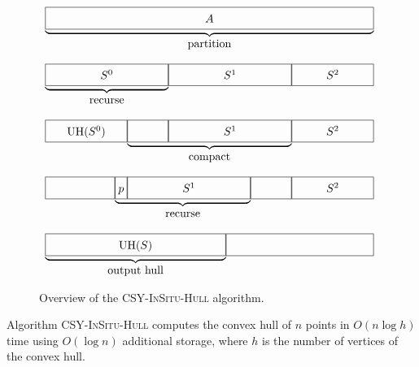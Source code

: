 \documentclass{elsart}
\begin{document}
\begin{figure}
\begin{center}
$\begin{array}{c}
   \underbrace{\framebox[4in]{\fillit $A$}} \\
   \mbox{partition}
\end{array}$

\vspace{2ex}

$\begin{array}{c@{}c@{}c}
   \underbrace{\framebox[1.5in]{\fillit $S^0$}} & 
   \framebox[1.5in]{\fillit $S^1$} 
   \framebox[1in]{\fillit $S^2$} \\
   \mbox{recurse}
\end{array}$

\vspace{2ex}

$\begin{array}{c@{}c@{}c}
   \framebox[1in]{\fillit $\mathrm{UH}(S^0)$} &
   \underbrace{\framebox[.5in]{\fillit}
   \framebox[1.5in]{\fillit $S^1$}} & 
   \framebox[1in]{\fillit $S^2$} \\
   & \mbox{compact}
\end{array}$

\vspace{2ex}

$\begin{array}{c@{}c@{}c}
   \framebox[.85in]{\fillit} &
   \underbrace{\framebox[.15in]{\fillit $p$}
   \framebox[1.5in]{\fillit $S^1$}} & 
   \framebox[.5in]{\fillit}
   \framebox[1in]{\fillit $S^2$} \\
   & \mbox{recurse}
\end{array}$

\vspace{2ex}

$\begin{array}{c@{}c@{}c}
   \underbrace{\framebox[2.2in]{\fillit $\mathrm{UH}(S)$}} &
   \framebox[1.8in]{\fillit} \\ 
   \mbox{output hull}
\end{array}$
\end{center}
\caption{Overview of the \textsc{CSY-InSitu-Hull} algorithm.}
\end{figure}


\begin{thm}
Algorithm \textsc{CSY-InSitu-Hull} computes the convex hull of $n$
points in $O(n\log h)$ time using $O(\log n)$ additional storage,
where $h$ is the number of vertices of the convex hull.
\end{thm}
\end{document}
